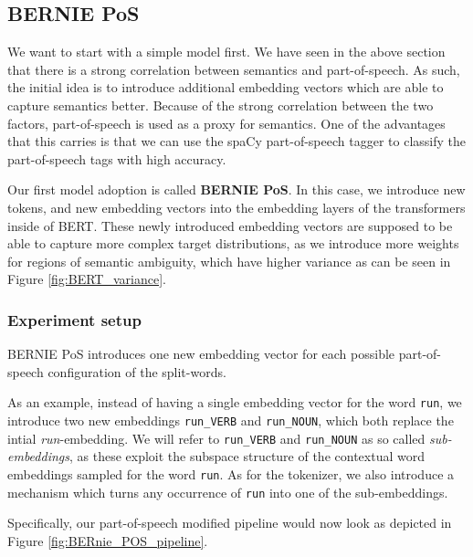 \documentclass[a4paper,12pt,oneside,openright]{report}
\begin{document}
\subsection{BERNIE PoS} \label{bernie_pos}

We want to start with a simple model first.
We have seen in the above section that there is a strong correlation between semantics and part-of-speech.
As such, the initial idea is to introduce additional embedding vectors which are able to capture semantics better.
Because of the strong correlation between the two factors, part-of-speech is used as a proxy for semantics.
One of the advantages that this carries is that we can use the spaCy part-of-speech tagger \cite{spacyb} to classify the part-of-speech tags with high accuracy.

Our first model adoption is called \textbf{BERNIE PoS}.
In this case, we introduce new tokens, and new embedding vectors into the embedding layers of the transformers inside of BERT.
These newly introduced embedding vectors are supposed to  be able to capture more complex target distributions, as we introduce more weights for regions of semantic ambiguity, which have higher variance as can be seen in Figure \eqref{fig:BERT_variance}.

\subsubsection{Experiment setup}

BERNIE PoS introduces one new embedding vector for each possible part-of-speech configuration of the split-words.

As an example, instead of having a single embedding vector for the word \Verb#run#, we introduce two new embeddings \Verb#run_VERB# and \Verb#run_NOUN#, which both replace the intial \textit{run}-embedding. 
We will refer to \Verb#run_VERB# and \Verb#run_NOUN# as so called \textit{sub-embeddings}, as these exploit the subspace structure of the contextual word embeddings sampled for the word \Verb#run#.
As for the tokenizer, we also introduce a mechanism which turns any occurrence of \Verb#run# into one of the sub-embeddings.

Specifically, our part-of-speech modified pipeline would now look as depicted in Figure \ref{fig:BERnie_POS_pipeline}.
\end{document}
